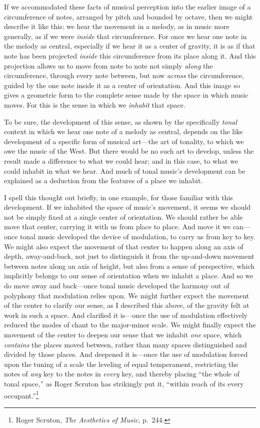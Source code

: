 \documentclass[12pt]{memoir}
\begin{document}
If we accommodated these facts of musical perception into the earlier
image of a circumference of notes, arranged by pitch and bounded by
octave, then we might describe it like this: we hear the movement in a
melody, as in music more generally, as if we were \emph{inside} that
circumference. For once we hear one note in the melody as central,
especially if we hear it as a center of gravity, it is as if that note
has been projected \emph{inside} this circumference from its place along
it. And this projection allows us to move from note to note not simply
\emph{along} the circumference, through every note between, but now
\emph{across} the circumference, guided by the one note inside it as a
center of orientation. And this image so gives a geometric form to the
complete sense made by the space in which music moves. For this is the
sense in which we \emph{inhabit} that space.

To be sure, the development of this sense, as shown by the specifically
\emph{tonal} context in which we hear one note of a melody as central,
depends on the like development of a specific form of musical art---the
art of tonality, to which we owe the music of the West. But there would
be no such art to develop, unless the result made a difference to what
we could hear; and in this case, to what we could inhabit in what we
hear. And much of tonal music's development can be explained as a
deduction from the features of a place we inhabit.

I spell this thought out briefly, in one example, for those familiar
with this development. If we inhabited the space of music's movement, it
seems we should not be simply fixed at a single center of orientation.
We should rather be able move that center, carrying it with us from
place to place. And move it we can---once tonal music developed the
device of modulation, to carry us from key to key. We might also expect
the movement of that center to happen along an axis of depth,
away-and-back, not just to distinguish it from the up-and-down movement
between notes along an axis of height, but also from a sense of
perspective, which implicitly belongs to our sense of orientation when
we inhabit a place. And so we do move away and back---once tonal music
developed the harmony out of polyphony that modulation relies upon. We
might further expect the movement of the center to clarify our sense, as
I described this above, of the gravity felt at work in such a space. And
clarified it is---once the use of modulation effectively reduced the
modes of chant to the major-minor scale. We might finally expect the
movement of the center to deepen our sense that we inhabit \emph{one}
space, which \emph{contains} the places moved between, rather than many
spaces distinguished and divided by those places. And deepened it
is---once the use of modulation forced upon the tuning of a scale the
leveling of equal temperament, restricting the notes of \emph{any} key
to the notes in \emph{every} key, and thereby placing ``the whole of
tonal space,'' as Roger Scruton has strikingly put it, ``within reach of
its every occupant.''\footnote{Roger Scruton, \emph{The Aesthetics of
  Music}, p.~244.}
\end{document}

